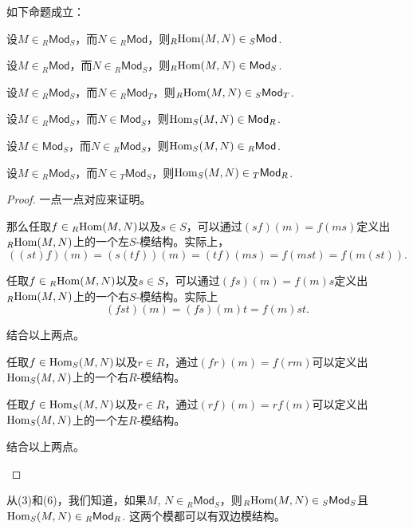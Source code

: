 \begin{lem}\label{lemmod}如下命题成立：
\begin{compactenum}[~~~(1)]
\item 设$M\in {}_R\mathsf{Mod}_S$，而$N\in {}_R\mathsf{Mod}$，则${}_R\!\operatorname{Hom}(M,N)\in {}_S\mathsf{Mod}$.
\item 设$M\in {}_R\mathsf{Mod}$，而$N\in {}_R\mathsf{Mod}_S$，则${}_R\!\operatorname{Hom}(M,N)\in \mathsf{Mod}_S$.
\item 设$M\in {}_R\mathsf{Mod}_S$，而$N\in {}_R\mathsf{Mod}_T$，则${}_R\!\operatorname{Hom}(M,N)\in {}_S\mathsf{Mod}_T$.
\item 设$M\in {}_R\mathsf{Mod}_S$，而$N\in \mathsf{Mod}_S$，则$\operatorname{Hom}_S(M,N)\in \mathsf{Mod}_R$.
\item 设$M\in \mathsf{Mod}_S$，而$N\in {}_R\mathsf{Mod}_S$，则$\operatorname{Hom}_S(M,N)\in {}_R\mathsf{Mod}$.
\item 设$M\in {}_R\mathsf{Mod}_S$，而$N\in {}_T\mathsf{Mod}_S$，则$\operatorname{Hom}_S(M,N)\in {}_T\mathsf{Mod}_R$.
\end{compactenum}
\end{lem}

\begin{proof}
一点一点对应来证明。
\begin{compactenum}[(1)]
\item 那么任取$f\in {}_R\!\operatorname{Hom}(M,N)$以及$s\in S$，可以通过$(sf)(m)=f(ms)$定义出${}_R\!\operatorname{Hom}(M,N)$上的一个左$S$-模结构。实际上，
\[
	((st)f)(m)=(s(tf))(m)=(tf)(ms)=f(mst)=f(m(st)).
\]

\item 任取$f\in {}_R\!\operatorname{Hom}(M,N)$以及$s\in S$，可以通过$(fs)(m)=f(m)s$定义出${}_R\!\operatorname{Hom}(M,N)$上的一个右$S$-模结构。实际上
\[
	(fst)(m)=(fs)(m)t=f(m)st.
\]

\item 结合以上两点。

\item 任取$f\in \operatorname{Hom}_S(M,N)$以及$r\in R$，通过$(fr)(m)=f(rm)$可以定义出$\operatorname{Hom}_S(M,N)$上的一个右$R$-模结构。

\item 任取$f\in \operatorname{Hom}_S(M,N)$以及$r\in R$，通过$(rf)(m)=rf(m)$可以定义出$\operatorname{Hom}_S(M,N)$上的一个左$R$-模结构。

\item 结合以上两点。\qedhere
\end{compactenum}
\end{proof}

从(3)和(6)，我们知道，如果$M$, $N\in {}_R\mathsf{Mod}_S$，则${}_R\!\operatorname{Hom}(M,N)\in {}_S\mathsf{Mod}_S$且$\operatorname{Hom}_S(M,N)\in {}_R\mathsf{Mod}_R$. 这两个模都可以有双边模结构。

